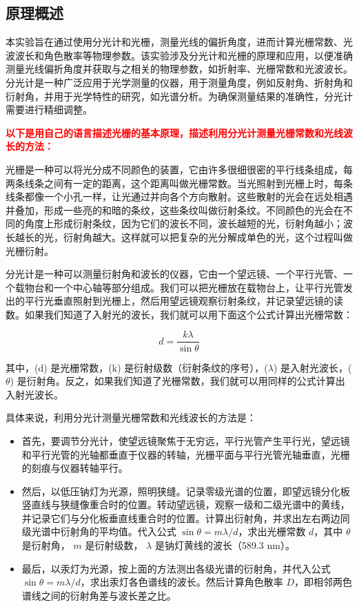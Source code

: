 \documentclass[dvipsnames, svgnames,a4paper,11pt]{article}
\begin{document}
	
	
	\subsection{原理概述}
	本实验旨在通过使用分光计和光栅，测量光线的偏折角度，进而计算光栅常数、光波波长和角色散率等物理参数。该实验涉及分光计和光栅的原理和应用，以便准确测量光线偏折角度并获取与之相关的物理参数，如折射率、光栅常数和光波波长。分光计是一种广泛应用于光学测量的仪器，用于测量角度，例如反射角、折射角和衍射角，并用于光学特性的研究，如光谱分析。为确保测量结果的准确性，分光计需要进行精细调整。
	
	\textcolor{red}{\textbf{以下是用自己的语言描述光栅的基本原理，描述利用分光计测量光栅常数和光线波长的方法：}}
	
	光栅是一种可以将光分成不同颜色的装置，它由许多很细很密的平行线条组成，每两条线条之间有一定的距离，这个距离叫做光栅常数。当光照射到光栅上时，每条线条都像一个小孔一样，让光通过并向各个方向散射。这些散射的光会在远处相遇并叠加，形成一些亮的和暗的条纹，这些条纹叫做衍射条纹。不同颜色的光会在不同的角度上形成衍射条纹，因为它们的波长不同，波长越短的光，衍射角越小；波长越长的光，衍射角越大。这样就可以把复杂的光分解成单色的光，这个过程叫做光栅衍射。
	
	分光计是一种可以测量衍射角和波长的仪器，它由一个望远镜、一个平行光管、一个载物台和一个中心轴等部分组成。我们可以把光栅放在载物台上，让平行光管发出的平行光垂直照射到光栅上，然后用望远镜观察衍射条纹，并记录望远镜的读数。如果我们知道了入射光的波长，我们就可以用下面这个公式计算出光栅常数：
	
	\[ d = \frac{k \lambda}{\sin \theta} \]
	
	其中，(d) 是光栅常数，(k) 是衍射级数（衍射条纹的序号），($\lambda$) 是入射光波长，($\theta$) 是衍射角。反之，如果我们知道了光栅常数，我们就可以用同样的公式计算出入射光波长。	
	
	具体来说，利用分光计测量光栅常数和光线波长的方法是：
	
	\begin{itemize}
		\item 首先，要调节分光计，使望远镜聚焦于无穷远，平行光管产生平行光，望远镜和平行光管的光轴都垂直于仪器的转轴，光栅平面与平行光管光轴垂直，光栅的刻痕与仪器转轴平行。
		\item 然后，以低压钠灯为光源，照明狭缝。记录零级光谱的位置，即望远镜分化板竖直线与狭缝像重合时的位置。转动望远镜，观察一级和二级光谱中的黄线，并记录它们与分化板垂直线重合时的位置。计算出衍射角，并求出左右两边同级光谱中衍射角的平均值。代入公式 $\sin \theta = m\lambda/d$，求出光栅常数 $d$，其中 $\theta$ 是衍射角， $m$ 是衍射级数， $\lambda$ 是钠灯黄线的波长（589.3 nm）。
		\item 最后，以汞灯为光源，按上面的方法测出各级光谱的衍射角，并代入公式 $\sin \theta = m\lambda/d$，求出汞灯各色谱线的波长。然后计算角色散率 $D$，即相邻两色谱线之间的衍射角差与波长差之比。
	\end{itemize}
	
\end{document}
